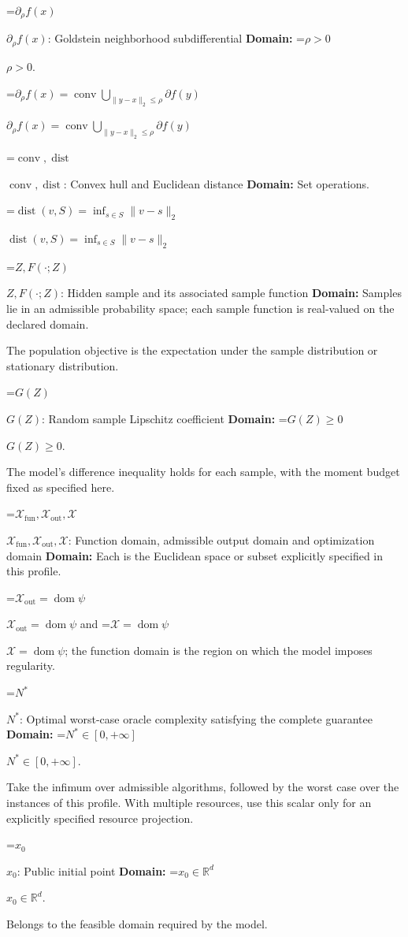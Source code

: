 \documentclass[10pt,a4paper]{article}
\newcommand{\AtlasMath}[1]{\par\begingroup\centering\setbox0=\hbox{$\displaystyle #1$}\ifdim\wd0>1.4\linewidth\typeout{ATLAS WIDE FORMULA: \the\wd0}\fi\ifdim\wd0>\linewidth\resizebox{\linewidth}{!}{\box0}\else\box0\fi\par\endgroup}
\newcommand{\AtlasInlineMath}[1]{\begingroup\setbox0=\hbox{$#1$}\ifdim\wd0>.4\linewidth\endgroup\AtlasMath{#1}\else\endgroup$#1$\fi}
\begin{document}
\AtlasInlineMath{\partial_\rho f(x)}: Goldstein neighborhood subdifferential \textbf{Domain:} \AtlasInlineMath{\rho>0}.

\AtlasInlineMath{\partial_\rho f(x)=\operatorname{conv}\bigcup_{\|y-x\|_2\le\rho}\partial f(y)}

\AtlasInlineMath{\operatorname{conv},\operatorname{dist}}: Convex hull and Euclidean distance \textbf{Domain:} Set operations.

\AtlasInlineMath{\operatorname{dist}(v,S)=\inf_{s\in S}\|v-s\|_2}

\AtlasInlineMath{Z,F(\cdot;Z)}: Hidden sample and its associated sample function \textbf{Domain:} Samples lie in an admissible probability space; each sample function is real-valued on the declared domain.

The population objective is the expectation under the sample distribution or stationary distribution.

\AtlasInlineMath{G(Z)}: Random sample Lipschitz coefficient \textbf{Domain:} \AtlasInlineMath{G(Z)\ge0}.

The model's difference inequality holds for each sample, with the moment budget fixed as specified here.

\AtlasInlineMath{\mathcal{X}_{\mathrm{fun}},\mathcal{X}_{\mathrm{out}},\mathcal{X}}: Function domain, admissible output domain and optimization domain \textbf{Domain:} Each is the Euclidean space or subset explicitly specified in this profile.

\AtlasInlineMath{\mathcal{X}_{\mathrm{out}}=\operatorname{dom}\psi} and \AtlasInlineMath{\mathcal{X}=\operatorname{dom}\psi}; the function domain is the region on which the model imposes regularity.

\AtlasInlineMath{N^*}: Optimal worst-case oracle complexity satisfying the complete guarantee \textbf{Domain:} \AtlasInlineMath{N^*\in[0,+\infty]}.

Take the infimum over admissible algorithms, followed by the worst case over the instances of this profile. With multiple resources, use this scalar only for an explicitly specified resource projection.

\AtlasInlineMath{x_0}: Public initial point \textbf{Domain:} \AtlasInlineMath{x_0\in\mathbb{R}^d}.

Belongs to the feasible domain required by the model.
\end{document}

